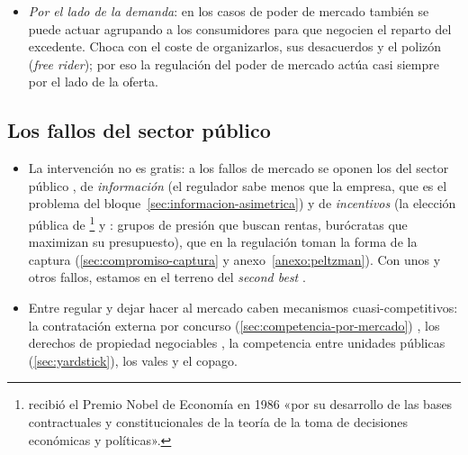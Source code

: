 \documentclass[11pt]{article}
\begin{document}
\begin{itemize}
\begin{itemize}
  \item la regulación de la salud y la seguridad se justifica por fallos de mercado (externalidades, información asimétrica), pero también por los derechos humanos y el paternalismo;
  \item el servicio universal de las industrias de red mezcla la eficiencia (aprovechar la red) y la equidad (tarifas uniformes en todo el territorio).
  \end{itemize}
\item \emph{Por el lado de la demanda}: en los casos de poder de mercado también se puede actuar agrupando a los consumidores para que negocien el reparto del excedente. Choca con el coste de organizarlos, sus desacuerdos y el polizón (\emph{free rider}); por eso la regulación del poder de mercado actúa casi siempre por el lado de la oferta.
\end{itemize}

\subsection{Los fallos del sector público}\label{anexo:fallos-sector-publico}

\begin{itemize}
\item La intervención no es gratis: a los fallos de mercado se oponen los del sector público  , de \emph{información} (el regulador sabe menos que la empresa, que es el problema del bloque~\ref{sec:informacion-asimetrica}) y de \emph{incentivos} (la elección pública de \footnote{ recibió el Premio Nobel de Economía en 1986 «por su desarrollo de las bases contractuales y constitucionales de la teoría de la toma de decisiones económicas y políticas»\nocite{Nobel1986Buchanan}.} y : grupos de presión que buscan rentas, burócratas que maximizan su presupuesto), que en la regulación toman la forma de la captura (\ref{sec:compromiso-captura} y anexo~\ref{anexo:peltzman}). Con unos y otros fallos, estamos en el terreno del \emph{second best} .
\item Entre regular y dejar hacer al mercado caben mecanismos cuasi-competitivos: la contratación externa por concurso (\ref{sec:competencia-por-mercado}) , los derechos de propiedad negociables , la competencia entre unidades públicas (\ref{sec:yardstick}), los vales y el copago.
\end{itemize}
\end{document}

